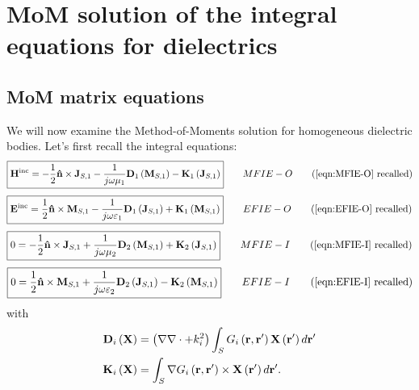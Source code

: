 \chapter{MoM solution of the integral equations for dielectrics}

\section{MoM matrix equations}
%
\par
We will now examine the Method-of-Moments solution for homogeneous dielectric bodies. Let's first recall the integral equations:
\begin{equation*}
\boxed{
\field{H}^\text{inc} = - \frac{1}{2} \vect{\hat{n}} \times \current{J}_{S,1} - \frac{1}{j \omega \mu_1} \operator{D}_1 \left( \current{M}_{S,1}\right) - \operator{K}_1 \left(\current{J}_{S,1}\right)
} \qquad MFIE-O \tag{\ref{eqn:MFIE-O} recalled}
\end{equation*}
\begin{equation*}
\boxed{
\field{E}^\text{inc} =  \frac{1}{2} \vect{\hat{n}} \times \current{M}_{S,1} - \frac{1}{j \omega \varepsilon_1} \operator{D}_1 \left( \current{J}_{S,1}\right) + \operator{K}_1 \left(\current{M}_{S,1}\right)
} \qquad EFIE-O \tag{\ref{eqn:EFIE-O} recalled}
\end{equation*}
\begin{equation*}
\boxed{
0 = - \frac{1}{2} \vect{\hat{n}} \times \current{J}_{S,1} + \frac{1}{j \omega \mu_2} \operator{D}_2\left(\current{M}_{S,1}\right) +  \operator{K}_2\left( \current{J}_{S,1}\right)
} \qquad MFIE-I \tag{\ref{eqn:MFIE-I} recalled}
\end{equation*}
\begin{equation*}
\boxed{
0 = \frac{1}{2} \vect{\hat{n}} \times \current{M}_{S,1} + \frac{1}{j \omega \varepsilon_2} \operator{D}_2\left(\current{J}_{S,1}\right) -  \operator{K}_2\left( \current{M}_{S,1}\right)
} \qquad EFIE-I \tag{\ref{eqn:EFIE-I} recalled}
\end{equation*}
with
\begin{align*}
\mathbf{D}_i\left(\mathbf{X}\right) &= \left(\nabla \nabla \cdot + k_i^2\right) \int_{S} G_i\left(\mathbf{r}, \mathbf{r}'\right) \mathbf{X}\left(\mathbf{r}'\right) d\mathbf{r}' \\
\mathbf{K}_i\left(\mathbf{X}\right) &= \int_S \nabla G_i\left(\mathbf{r}, \mathbf{r}'\right) \times \mathbf{X}\left(\mathbf{r}'\right) d\mathbf{r}'.
\end{align*}
%
\par
